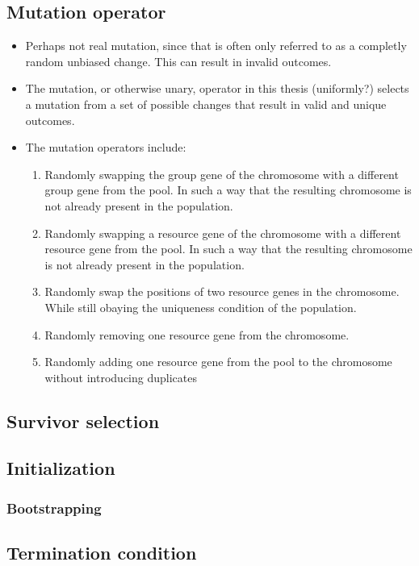 \subsection{Mutation operator}
\label{sec:approach_mutation_operator}
\begin{itemize}
	\item Perhaps not real mutation, since that is often only referred to as a
		completly random unbiased change. This can result in invalid outcomes.
	\item The mutation, or otherwise unary, operator in this thesis
		(uniformly?) selects a mutation from a set of possible changes that result
		in valid and unique outcomes.
	\item The mutation operators include:
		\begin{enumerate}
			\item Randomly swapping the group gene of the chromosome with a
				different group gene from the pool. In such a way that the
				resulting chromosome is not already present in the population.
			\item Randomly swapping a resource gene of the chromosome with a
				different resource gene from the pool. In such a way that the
				resulting chromosome is not already present in the population.
			\item Randomly swap the positions of two resource genes in the
				chromosome. While still obaying the uniqueness condition of the
				population.
			\item Randomly removing one resource gene from the chromosome.
			\item Randomly adding one resource gene from the pool to the
				chromosome without introducing duplicates
		\end{enumerate}
\end{itemize}
\subsection{Survivor selection}
\label{sec:approach_survivor_selection}
\subsection{Initialization}
\subsubsection{Bootstrapping}
\subsection{Termination condition}
